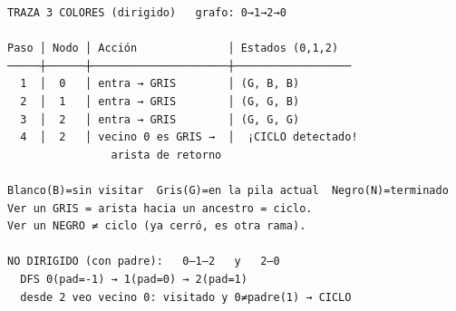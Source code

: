 \begin{dsacomofunciona}
\begin{verbatim}
TRAZA 3 COLORES (dirigido)   grafo: 0→1→2→0

Paso │ Nodo │ Acción              │ Estados (0,1,2)
─────┼──────┼─────────────────────┼──────────────────
  1  │  0   │ entra → GRIS        │ (G, B, B)
  2  │  1   │ entra → GRIS        │ (G, G, B)
  3  │  2   │ entra → GRIS        │ (G, G, G)
  4  │  2   │ vecino 0 es GRIS →  │  ¡CICLO detectado!
                arista de retorno

Blanco(B)=sin visitar  Gris(G)=en la pila actual  Negro(N)=terminado
Ver un GRIS = arista hacia un ancestro = ciclo.
Ver un NEGRO ≠ ciclo (ya cerró, es otra rama).

NO DIRIGIDO (con padre):   0—1—2   y   2—0
  DFS 0(pad=-1) → 1(pad=0) → 2(pad=1)
  desde 2 veo vecino 0: visitado y 0≠padre(1) → CICLO
\end{verbatim}
\end{dsacomofunciona}

